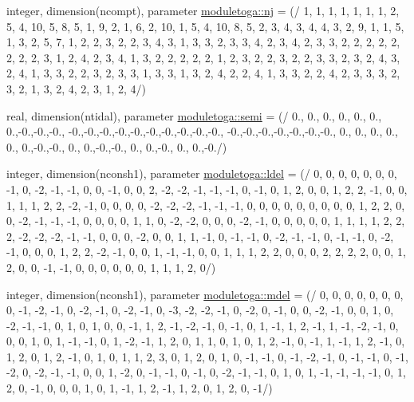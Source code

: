\begin{DoxyCompactItemize}
integer, dimension(ncompt), parameter \mbox{\hyperlink{namespacemoduletoga_a35b3164d881bfedd7e51ef9b88f7251a}{moduletoga\+::nj}} = (/ 1, 1, 1, 1, 1, 1, 1, 2, 5, 4, 10, 5, 8, 5, 1, 9, 2, 1, 6, 2, 10, 1, 5, 4, 10, 8, 5, 2, 3, 4, 3, 4, 4, 3, 2, 9, 1, 1, 5, 1, 3, 2, 5, 7, 1, 2, 2, 3, 2, 2, 3, 4, 3, 1, 3, 3, 2, 3, 3, 4, 2, 3, 4, 2, 3, 3, 2, 2, 2, 2, 2, 2, 2, 2, 3, 1, 2, 4, 2, 3, 4, 1, 3, 2, 2, 2, 2, 2, 1, 2, 3, 2, 2, 3, 2, 2, 3, 3, 2, 3, 2, 4, 3, 2, 4, 1, 3, 3, 2, 2, 3, 2, 3, 3, 1, 3, 3, 1, 3, 2, 4, 2, 2, 4, 1, 3, 3, 2, 2, 4, 2, 3, 3, 3, 2, 3, 2, 1, 3, 2, 4, 2, 3, 1, 2, 4/)
\item 
real, dimension(ntidal), parameter \mbox{\hyperlink{namespacemoduletoga_a50b0081d60454bd6a0be5d7521a43c30}{moduletoga\+::semi}} = (/ 0., 0., 0., 0., 0., 0., 0.,-\/0.,-\/0.,-\/0., -\/0.,-\/0.,-\/0.,-\/0.,-\/0.,-\/0.,-\/0.,-\/0.,-\/0.,-\/0., -\/0.,-\/0.,-\/0.,-\/0.,-\/0.,-\/0.,-\/0., 0., 0., 0., 0., 0., 0.,-\/0.,-\/0., 0., 0.,-\/0.,-\/0., 0., 0.,-\/0., 0., 0.,-\/0./)
\item 
integer, dimension(nconsh1), parameter \mbox{\hyperlink{namespacemoduletoga_a452c366ecc44674354e6166ee7ae0e3b}{moduletoga\+::ldel}} = (/ 0, 0, 0, 0, 0, 0, 0, -\/1, 0, -\/2, -\/1, -\/1, 0, 0, -\/1, 0, 0, 2, -\/2, -\/2, -\/1, -\/1, -\/1, 0, -\/1, 0, 1, 2, 0, 0, 1, 2, 2, -\/1, 0, 0, 1, 1, 1, 2, 2, -\/2, -\/1, 0, 0, 0, 0, -\/2, -\/2, -\/2, -\/1, -\/1, -\/1, 0, 0, 0, 0, 0, 0, 0, 0, 0, 1, 2, 2, 0, 0, -\/2, -\/1, -\/1, -\/1, 0, 0, 0, 0, 1, 1, 0, -\/2, -\/2, 0, 0, 0, -\/2, -\/1, 0, 0, 0, 0, 0, 1, 1, 1, 1, 2, 2, 2, -\/2, -\/2, -\/2, -\/1, -\/1, 0, 0, 0, -\/2, 0, 0, 1, 1, -\/1, 0, -\/1, -\/1, 0, -\/2, -\/1, -\/1, 0, -\/1, -\/1, 0, -\/2, -\/1, 0, 0, 0, 1, 2, 2, -\/2, -\/1, 0, 0, 1, -\/1, -\/1, 0, 0, 1, 1, 1, 2, 2, 0, 0, 0, 2, 2, 2, 2, 0, 0, 1, 2, 0, 0, -\/1, -\/1, 0, 0, 0, 0, 0, 0, 1, 1, 1, 2, 0/)
\item 
integer, dimension(nconsh1), parameter \mbox{\hyperlink{namespacemoduletoga_aed174ad28ce23b2187ea9b5f64d81002}{moduletoga\+::mdel}} = (/ 0, 0, 0, 0, 0, 0, 0, 0, -\/1, -\/2, -\/1, 0, -\/2, -\/1, 0, -\/2, -\/1, 0, -\/3, -\/2, -\/2, -\/1, 0, -\/2, 0, -\/1, 0, 0, -\/2, -\/1, 0, 0, 1, 0, -\/2, -\/1, -\/1, 0, 1, 0, 1, 0, 0, -\/1, 1, 2, -\/1, -\/2, -\/1, 0, -\/1, 0, 1, -\/1, 1, 2, -\/1, 1, -\/1, -\/2, -\/1, 0, 0, 0, 1, 0, 1, -\/1, -\/1, 0, 1, -\/2, -\/1, 1, 2, 0, 1, 1, 0, 1, 0, 1, 2, -\/1, 0, -\/1, 1, -\/1, 1, 2, -\/1, 0, 1, 2, 0, 1, 2, -\/1, 0, 1, 0, 1, 1, 2, 3, 0, 1, 2, 0, 1, 0, -\/1, -\/1, 0, -\/1, -\/2, -\/1, 0, -\/1, -\/1, 0, -\/1, -\/2, 0, -\/2, -\/1, -\/1, 0, 0, 1, -\/2, 0, -\/1, -\/1, 0, -\/1, 0, -\/2, -\/1, -\/1, 0, 1, 0, 1, -\/1, -\/1, -\/1, -\/1, 0, 1, 2, 0, -\/1, 0, 0, 0, 1, 0, 1, -\/1, 1, 2, -\/1, 1, 2, 0, 1, 2, 0, -\/1/)

\end{DoxyCompactItemize}
